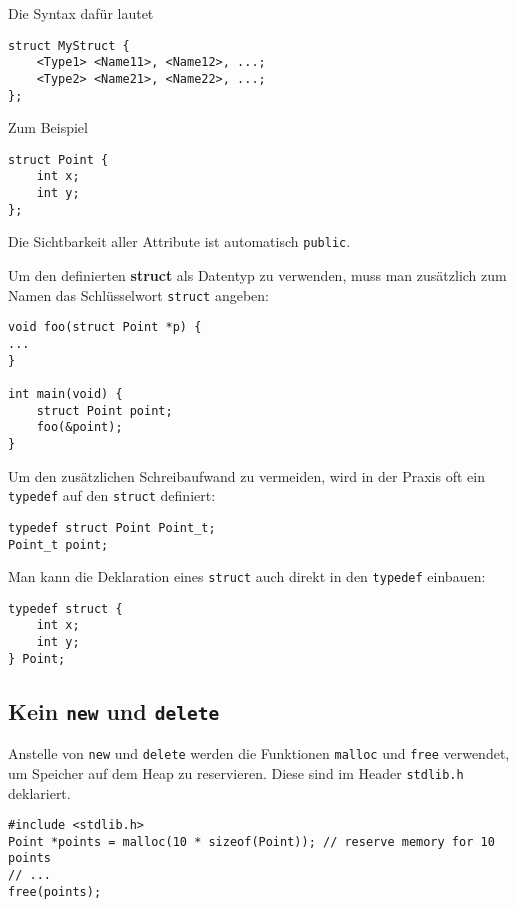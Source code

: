 Die Syntax dafür lautet

\begin{lstlisting}
struct MyStruct {
	<Type1> <Name11>, <Name12>, ...;
	<Type2> <Name21>, <Name22>, ...;
};
\end{lstlisting}

Zum Beispiel

\begin{lstlisting}
struct Point {
	int x;
	int y;
};
\end{lstlisting}

Die Sichtbarkeit aller Attribute ist automatisch \texttt{public}.

Um den definierten \textbf{struct} als Datentyp zu verwenden, muss man zusätzlich zum Namen das Schlüsselwort \texttt{struct} angeben:

\begin{lstlisting}
void foo(struct Point *p) {
...
}

int main(void) {
	struct Point point;
	foo(&point);
}
\end{lstlisting}

Um den zusätzlichen Schreibaufwand zu vermeiden, wird in der Praxis oft ein \texttt{typedef} auf den \texttt{struct} definiert:

\begin{lstlisting}
typedef struct Point Point_t;
Point_t point;
\end{lstlisting}

Man kann die Deklaration eines \texttt{struct} auch direkt in den \texttt{typedef} einbauen:

\begin{lstlisting}
typedef struct {
	int x;
	int y;
} Point;
\end{lstlisting}

\subsection{Kein \texttt{new} und \texttt{delete}}

Anstelle von \texttt{new} und \texttt{delete} werden die Funktionen \texttt{malloc} und \texttt{free} verwendet, um Speicher auf dem Heap zu reservieren.
Diese sind im Header \texttt{stdlib.h} deklariert.

\begin{lstlisting}
#include <stdlib.h>
Point *points = malloc(10 * sizeof(Point)); // reserve memory for 10 points
// ...
free(points);
\end{lstlisting}

